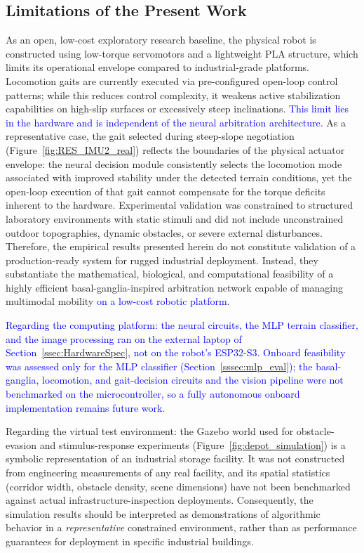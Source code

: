 \documentclass[preprint,12pt]{elsarticle}
\newcommand{\revblue}[1]{\textcolor{blue}{#1}}
\begin{document}
\subsection{Limitations of the Present Work}
\label{ssec:Limitations}

As an open, low-cost exploratory research baseline, the physical robot is constructed using low-torque servomotors and a lightweight PLA structure, which limits its operational envelope compared to industrial-grade platforms. Locomotion gaits are currently executed via pre-configured open-loop control patterns; while this reduces control complexity, it weakens active stabilization capabilities on high-slip surfaces or excessively steep inclinations. \revblue{This limit lies in the hardware and is independent of the neural arbitration architecture.} As a representative case, the gait selected during steep-slope negotiation (Figure~\ref{fig:RES_IMU2_real}) reflects the boundaries of the physical actuator envelope: the neural decision module consistently selects the locomotion mode associated with improved stability under the detected terrain conditions, yet the open-loop execution of that gait cannot compensate for the torque deficits inherent to the hardware. Experimental validation was constrained to structured laboratory environments with static stimuli and did not include unconstrained outdoor topographies, dynamic obstacles, or severe external disturbances. Therefore, the empirical results presented herein do not constitute validation of a production-ready system for rugged industrial deployment. Instead, they substantiate the mathematical, biological, and computational feasibility of a highly efficient basal-ganglia-inspired arbitration network capable of managing multimodal mobility \revblue{on a low-cost robotic platform}.


\revblue{Regarding the computing platform: the neural circuits, the MLP terrain classifier, and the image processing ran on the external laptop of Section~\ref{ssec:HardwareSpec}, not on the robot's ESP32-S3. Onboard feasibility was assessed only for the MLP classifier (Section~\ref{sssec:mlp_eval}); the basal-ganglia, locomotion, and gait-decision circuits and the vision pipeline were not benchmarked on the microcontroller, so a fully autonomous onboard implementation remains future work.}

%
Regarding the virtual test environment: the Gazebo world used for
obstacle-evasion and stimulus-response experiments
(Figure~\ref{fig:depot_simulation}) is a symbolic representation
of an industrial storage facility.
It was not constructed from engineering measurements of any
real facility, and its spatial statistics (corridor width,
obstacle density, scene dimensions) have not been benchmarked
against actual infrastructure-inspection deployments.
Consequently, the simulation results should be interpreted as
demonstrations of algorithmic behavior in a \emph{representative}
constrained environment, rather than as performance guarantees
for deployment in specific industrial buildings.%
\end{document}
